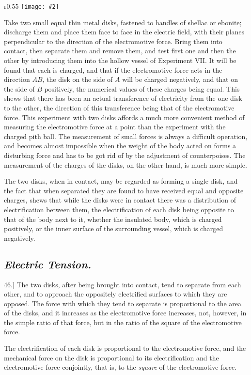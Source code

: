 \documentclass[12pt,oneside]{book}[2021/10/04]
\newcommand{\Heading}{\centering\normalfont}
\newcommand{\Subsection}[1]{\subsection*{\normalsize\Heading\itshape #1}}
\newcommand{\article}[1]{\phantomsection \label{art:#1}{#1.]}}
\newcommand{\wrapfig}[3]{
\begin{wrapfigure}{r}{#1\textwidth}
\centering
\texttt{[image: \#2]}
\caption*{\small #3}
\end{wrapfigure}}
\newcommand{\¬}{\hphantom{0}}
\begin{document}
\wrapfig{0.55}{054.png}{Fig. 15.}
Take two small equal thin metal disks, fastened to handles of
shellac or ebonite; discharge them and place them face to face in
the electric field, with their planes perpendicular to the direction of
the electromotive force. Bring them into contact, then separate
them and remove them, and
test first one and then the
other by introducing them
into the hollow vessel of Experiment
VII\@. It will be
found that each is charged,
and that if the electromotive
force acts in the direction \(AB\),
the disk on the side of \(A\) will
be charged negatively, and
that on the side of \(B\) positively,
the numerical values of these charges being equal. This shews
that there has been an actual transference of electricity from the one
disk to the other, the direction of this transference being that of
the electromotive force. This experiment with two disks affords a
much more convenient method of measuring the electromotive force
at a point than the experiment with the charged pith ball. The
measurement of small forces is always a difficult operation, and
becomes almost impossible when the weight of the body acted on
forms a disturbing force and has to be got rid of by the adjustment
of counterpoises. The measurement of the charges of the
disks, on the other hand, is much more simple.

The two disks, when in contact, may be regarded as forming a
single disk, and the fact that when separated they are found to
have received equal and opposite charges, shews that while the
disks were in contact there was a distribution of electrification
between them, the electrification of each disk being opposite to
that of the body next to it, whether the insulated body, which is
charged positively, or the inner surface of the surrounding vessel,
which is charged negatively.

\Subsection{Electric Tension.}

\article{46} The two disks, after being brought into contact, tend to
separate from each other, and to approach the oppositely electrified
surfaces to which they are opposed. The force with which they
tend to separate is proportional to the area of the disks, and it
increases as the electromotive force increases, not, however, in the
simple ratio of that force, but in the ratio of the square of the
electromotive force.

The electrification of each disk is proportional to the electromotive
force, and the mechanical force on the disk is proportional
to its electrification and the electromotive force conjointly, that is,
to the \textit{square} of the electromotive force.
\end{document}

